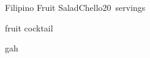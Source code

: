 \begin{recipe}{Filipino Fruit Salad}{Chello}{20~servings}

\begin{ingredients}
\item {} fruit cocktail
\end{ingredients}

\begin{directions}
\item gah
\end{directions}

\end{recipe}
